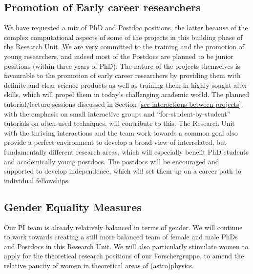 \documentclass[10pt,fleqn,twoside]{article}
\begin{document}
\subsection{Promotion of Early career researchers}

\noindent We have requested a mix of PhD and Postdoc positions, the
latter because of the complex computational aspects of some of the
projects in this building phase of the Research Unit. We are very
committed to the training and the promotion of young researchers, and
indeed most of the Postdocs are planned to be junior positions (within
three years of PhD). The nature of the projects themselves is
favourable to the promotion of early career researchers by providing
them with definite and clear science products as well as training them
in highly sought-after skills, which will propel them in today's
challenging academic world. The planned 
tutorial/lecture sessions discussed in Section 
\ref{sec-interactions-between-projects}, with the emphasis on small
interactive groups and ``for-student-by-student'' tutorials on often-used
techniques, will contribute to this. The Research Unit with the thriving
interactions and the team work towards a common goal also provide a
perfect environment to develop a broad view of interrelated, but
fundamentally different research areas, which will especially benefit
PhD students and academically young postdocs. The postdocs will be
encouraged and supported to develop independence, which will set them
up on a career path to individual fellowships. 

\subsection{Gender Equality Measures}

Our PI team is already relatively balanced in terms of gender. We will
continue to work towards creating a still
more balanced team of female and male PhDs and Postdocs in this
Research Unit. We will also particularly stimulate women to apply for the theoretical research positions of our Forschergruppe, to amend the relative paucity of women in theoretical areas of (astro)physics.

\end{document}
